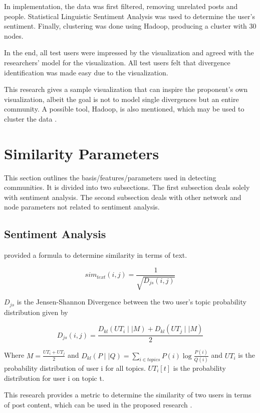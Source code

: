 In implementation, the data was first filtered, removing unrelated posts and people. Statistical Linguistic Sentiment Analysis was used to determine the user’s sentiment. Finally, clustering was done using Hadoop, producing a cluster with 30 nodes. 

In the end, all test users were impressed by the visualization and agreed with the researchers’ model for the visualization. All test users felt that divergence identification was made easy due to the visualization. 

This research gives a sample visualization that can inspire the proponent’s own visualization, albeit the goal is not to model single divergences but an entire community. A possible tool, Hadoop, is also mentioned, which may be used to cluster the data \cite{Cao:2015}.

\section{Similarity Parameters}
This section outlines the basis/features/parameters used in detecting communities. It is divided into two subsections. The first subsection deals solely with sentiment analysis. The second subsection deals with other network and node parameters not related to sentiment analysis. 

\subsection{Sentiment Analysis}

 provided a formula to determine similarity in terms of text. 

\begin{equation}
sim_{text}(i,j) = \frac{1}{\sqrt{D_{js}(i,j)}}
\end{equation}

$D_{js}$ is the Jensen-Shannon Divergence between the two user’s topic probability distribution given by

\begin{equation}
D_{js}(i,j) = \frac{D_{kl}(UT_i \mid\mid M) + D_{kl}(UT_j \mid\mid M)}{2}
\end{equation}

Where $M = \frac{UT_i + UT_j}{2}$ and $D_{kl}(P \mid\mid Q) = \sum_{i \in topics} P(i) \log{\frac{P(i)}{Q(i)}}$ and $UT_i$ is the probability distribution of user i for all topics. $UT_i[t]$ is the probability distribution for user i on topic t.

This research provides a metric to determine the similarity of two users in terms of post content, which can be used in the proposed research \cite{Zhang:2012}.

